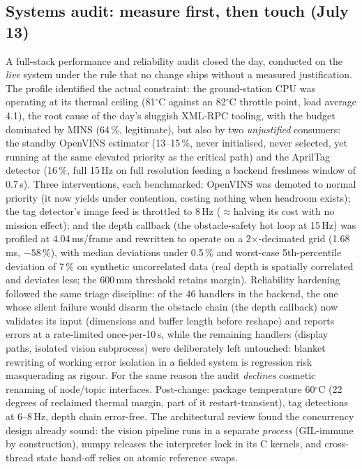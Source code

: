 \subsection{Systems audit: measure first, then touch (July 13)}
\label{sec:audit}
A full-stack performance and reliability audit closed the day, conducted on
the \emph{live} system under the rule that no change ships without a
measured justification. The profile identified the actual constraint: the
ground-station CPU was operating at its thermal ceiling (81$^\circ$C
against an 82$^\circ$C throttle point, load average 4.1), the root cause
of the day's sluggish XML-RPC tooling, with the budget dominated by MINS
(64\,\%, legitimate), but also by two \emph{unjustified} consumers: the
standby OpenVINS estimator (13--15\,\%, never initialised, never selected,
yet running at the same elevated  priority as the critical
path) and the AprilTag detector (16\,\%, full 15\,Hz on full resolution
feeding a backend freshness window of 0.7\,s). Three interventions, each
benchmarked: OpenVINS was demoted to normal priority (it now yields under
contention, costing nothing when headroom exists); the tag detector's image
feed is throttled to 8\,Hz ($\approx$halving its cost with no mission
effect); and the depth callback (the obstacle-safety hot loop at
15\,Hz) was profiled at 4.04\,ms/frame and rewritten to operate on a
2$\times$-decimated grid (1.68\,ms, $-58\,\%$), with median deviations
under 0.5\,\% and worst-case 5th-percentile deviation of 7\,\% on
synthetic uncorrelated data (real depth is spatially correlated and deviates
less; the 600\,mm threshold retains margin). Reliability hardening followed
the same triage discipline: of the 46  handlers in
the backend, the one whose silent failure would disarm the obstacle chain
(the depth callback) now validates its input (dimensions and buffer
length before reshape) and reports errors at a rate-limited once-per-10\,s,
while the remaining handlers (display paths, isolated vision subprocess)
were deliberately left untouched: blanket rewriting of working error
isolation in a fielded system is regression risk masquerading as rigour.
For the same reason the audit \emph{declines} cosmetic renaming of
node/topic interfaces. Post-change: package temperature 60$^\circ$C
(22 degrees of reclaimed thermal margin, part of it restart-transient),
tag detections at 6--8\,Hz, depth chain error-free. The architectural
review found the concurrency design already sound: the vision pipeline
runs in a separate \emph{process} (GIL-immune by construction), numpy
releases the interpreter lock in its C kernels, and cross-thread state
hand-off relies on atomic reference swaps.

